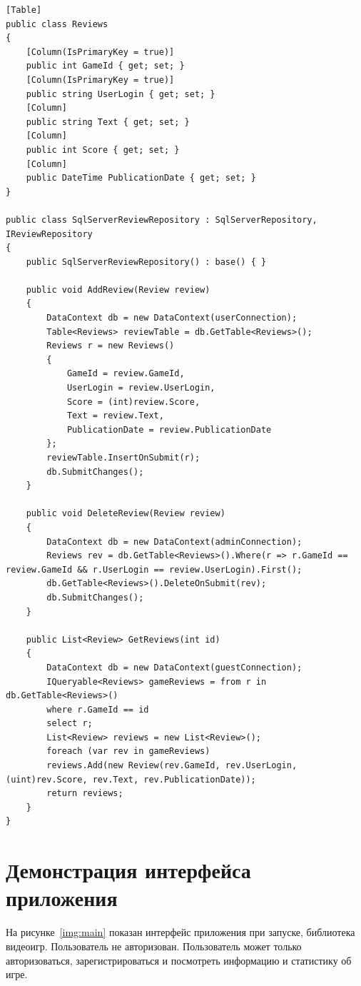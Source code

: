 \captionsetup{justification=raggedleft,singlelinecheck=off}
\begin{lstlisting}[label=lst:reviewRep, caption=Репозиторий SqlServerReviewRepository доступа к таблице Reviews из базы данных]
[Table]
public class Reviews
{
	[Column(IsPrimaryKey = true)]
	public int GameId { get; set; }
	[Column(IsPrimaryKey = true)]
	public string UserLogin { get; set; }
	[Column]
	public string Text { get; set; }
	[Column]
	public int Score { get; set; }
	[Column]
	public DateTime PublicationDate { get; set; }
}

public class SqlServerReviewRepository : SqlServerRepository, IReviewRepository
{
	public SqlServerReviewRepository() : base() { }
	
	public void AddReview(Review review)
	{
		DataContext db = new DataContext(userConnection);
		Table<Reviews> reviewTable = db.GetTable<Reviews>();
		Reviews r = new Reviews()
		{
			GameId = review.GameId,
			UserLogin = review.UserLogin,
			Score = (int)review.Score,
			Text = review.Text,
			PublicationDate = review.PublicationDate
		};
		reviewTable.InsertOnSubmit(r);
		db.SubmitChanges();
	}
	
	public void DeleteReview(Review review)
	{
		DataContext db = new DataContext(adminConnection);
		Reviews rev = db.GetTable<Reviews>().Where(r => r.GameId == review.GameId && r.UserLogin == review.UserLogin).First();
		db.GetTable<Reviews>().DeleteOnSubmit(rev);
		db.SubmitChanges();
	}
	
	public List<Review> GetReviews(int id)
	{
		DataContext db = new DataContext(guestConnection);
		IQueryable<Reviews> gameReviews = from r in db.GetTable<Reviews>()
		where r.GameId == id
		select r;
		List<Review> reviews = new List<Review>();
		foreach (var rev in gameReviews)
		reviews.Add(new Review(rev.GameId, rev.UserLogin, (uint)rev.Score, rev.Text, rev.PublicationDate));
		return reviews;
	}
}
\end{lstlisting}

\section{Демонстрация интерфейса приложения}

На рисунке~\ref{img:main} показан интерфейс приложения при запуске, библиотека видеоигр. Пользователь не авторизован. Пользователь может только авторизоваться, зарегистрироваться и посмотреть информацию и статистику об игре.

